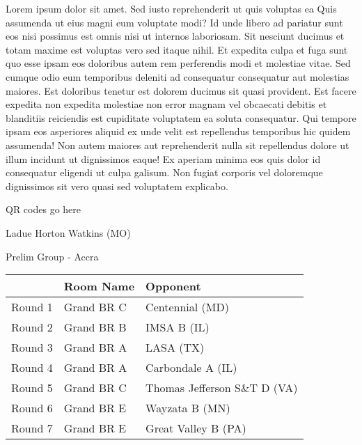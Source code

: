 \documentclass{article}%
\begin{document}
\vspace*{8pt}%
\linebreak%
\newline%
\newline%
Lorem ipsum dolor sit amet. Sed iusto reprehenderit ut quis voluptas ea Quis assumenda ut eius magni eum voluptate modi? Id unde libero ad pariatur sunt eos nisi possimus est omnis nisi ut internos laboriosam. Sit nesciunt ducimus et totam maxime est voluptas vero sed itaque nihil. Et expedita culpa et fuga sunt quo esse ipsam eos doloribus autem rem perferendis modi et molestiae vitae.\newline%
\newline%
Sed cumque odio eum temporibus deleniti ad consequatur consequatur aut molestias maiores. Est doloribus tenetur est dolorem ducimus sit quasi provident. Est facere expedita non expedita molestiae non error magnam vel obcaecati debitis et blanditiis reiciendis est cupiditate voluptatem ea soluta consequatur. Qui tempore ipsam eos asperiores aliquid ex unde velit est repellendus temporibus hic quidem assumenda!\newline%
\newline%
Non autem maiores aut reprehenderit nulla sit repellendus dolore ut illum incidunt ut dignissimos eaque! Ex aperiam minima eos quis dolor id consequatur eligendi ut culpa galisum. Non fugiat corporis vel doloremque dignissimos sit vero quasi sed voluptatem explicabo.\newline%
\newline%
%
\vspace*{30pt}%
\begin{center}%
\begin{Huge}%
QR codes go here%
\end{Huge}%
\end{center}%
\newpage%
%
\begin{center}%
\begin{Huge}%
Ladue Horton Watkins (MO)%
\end{Huge}%
\vspace*{8pt}%
\linebreak%
\begin{Large}%
Prelim Group {-} Accra%
\end{Large}%
\end{center}%
\begin{tabularx}{\textwidth}{|c|Y|Y|}%
\hline%
&Room Name&Opponent\\%
\hline%
Round 1&Grand BR C&Centennial (MD)\\%
Round 2&Grand BR B&IMSA B (IL)\\%
Round 3&Grand BR A&LASA (TX)\\%
Round 4&Grand BR A&Carbondale A (IL)\\%
Round 5&Grand BR C&Thomas Jefferson S\&T D (VA)\\%
Round 6&Grand BR E&Wayzata B (MN)\\%
Round 7&Grand BR E&Great Valley B (PA)\\%
\hline%
\end{tabularx}%
\end{document}
